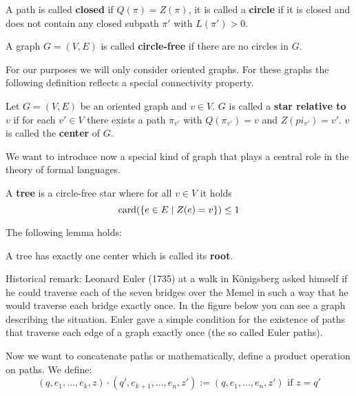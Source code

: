 A path is called {\bf closed} if $Q(\pi) = Z(\pi)$, it is called a {\bf circle}
if it is closed and does not contain any closed subpath $\pi'$ with $L(\pi') >
0$.

\bigskip
\begin{definition}
A graph $G = (V, E)$ is called {\bf circle-free} if there are no circles in $G$.
\end{definition}

For our purposes we will only consider oriented graphs. For these graphs the
following definition reflects a special connectivity property.

\bigskip
\begin{definition}
Let $G = (V, E)$ be an oriented graph and $v \in V$. $G$ is called a {\bf star
relative to $v$} if for each $v' \in V$ there exists a path $\pi_{v'}$ with
$Q(\pi_{v'}) = v$ and $Z(pi_{v'}) = v'$. $v$ is called the {\bf center} of $G$.
\end{definition} 

We want to introduce now a special kind of graph that plays a central role in
the theory of formal languages.

\bigskip
\begin{definition}
A {\bf tree} is a circle-free star where for all $v \in V$ it holds
\[ \mathrm{card}({\mbox{$\{e \in E \mid Z(e) = v\}$}}) \leq 1 \]
\end{definition}

The following lemma holds:
\begin{lemma}
A tree has exactly one center which is called its {\bf root}.
\end{lemma}

Historical remark: Leonard Euler (1735) at a walk in Königsberg asked himself if
he could traverse each of the seven bridges over the Memel in such
a way that he would traverse each bridge exactly once. In the figure below you
can see a graph describing the situation. Euler gave a simple condition for the
existence of paths that traverse each edge of a graph exactly once (the so
called Euler paths).

\begin{center}

\end{center}

Now we want to concatenate paths or mathematically, define a product operation
on paths. We define:
\[ (q, e_1, \ldots, e_k, z) \cdot (q', e_{k+1}, \ldots, e_n, z') := (q, e_1,
\ldots, e_n, z')\text{ if } z = q' \]

